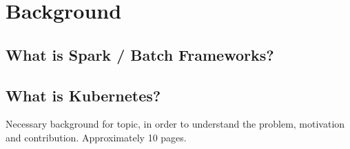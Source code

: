 \chapter{Background}
\section{What is Spark / Batch Frameworks?}
\section{What is Kubernetes?}
Necessary background for topic, in order to understand the problem, motivation and contribution. Approximately 10 pages.
